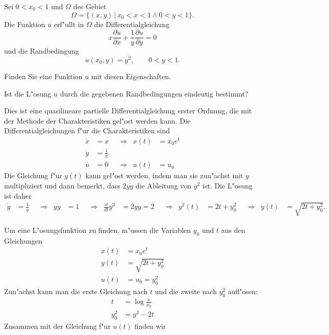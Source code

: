 Sei $0 < x_0 < 1$ und $\Omega$ des Gebiet
\[
\Omega=\{ (x,y)\,|\, x_0<x<1\wedge 0 < y < 1\}.
\]
Die Funktion $u$ erf"ullt in $\Omega$ die Differentialgleichung
\begin{equation}
x\frac{\partial u}{\partial x}
+
\frac1y\frac{\partial u}{\partial y}
=
0
\label{30000012:dgl}
\end{equation}
und die Randbedingung 
\[
u(x_0,y)=y^2,\qquad 0<y<1.
\]
\begin{teilaufgaben}
\item
Finden Sie eine Funktion $u$ mit diesen Eigenschaften.
\item
Ist die L"osung $u$ durch die gegebenen Randbedingungen eindeutig bestimmt?
\end{teilaufgaben}

\begin{loesung}
Dies ist eine quasilineare partielle Differentialgleichung erster Ordnung,
die mit der Methode der Charakteristiken gel"ost werden kann.
Die Differentialgleichungen f"ur die Charakteristiken sind
\[
\begin{aligned}
\dot x &= x       &&\Rightarrow&   x(t) &= x_0 e^t \\
\dot y &= \frac1y &&           &        &          \\
\dot u &= 0       &&\Rightarrow&   u(t) &= u_0
\end{aligned}
\]
Die Gleichung f"ur $y(t)$ kann gel"ost werden, indem man sie zun"achst mit
$y$ multipliziert und dann bemerkt, dass $2y\dot y$ die Ableitung von $y^2$
ist.
Die L"osung ist daher
\begin{align*}
\dot y &= \frac1y
&&\Rightarrow&
y\dot y &= 1
&&\Rightarrow&
\frac{d}{dt}y^2&=2y\dot y=2
&&\Rightarrow&
y^2(t) &= 2t + y_0^2
&&\Rightarrow&
y(t)&=\sqrt{2t+y_0^2}.
\end{align*}
\begin{teilaufgaben}
\item
Um eine L"osungsfunktion zu finden, m"ussen die Variablen $y_0$ und $t$ aus den
Gleichungen
\begin{align*}
x(t) &= x_0e^t\\
y(t)&=\sqrt{2t+y_0^2}\\
u(t)&=u_0 = y_0^2
\end{align*}
Zun"achst kann man die erste Gleichung nach $t$ und die zweite nach $y_0^2$
aufl"osen: 
\begin{align*}
t&=\log\frac{x}{x_0}\\
y_0^2&=y^2-2t
\end{align*}
Zusammen mit der Gleichung f"ur $u(t)$ finden wir

\end{teilaufgaben}
\end{loesung}
